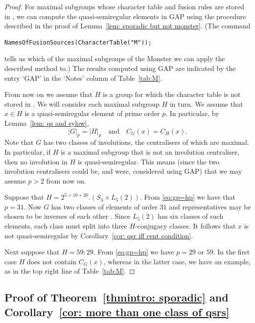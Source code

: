 \documentclass{article}
\theoremstyle{remark}
\theoremstyle{definition}
\newcommand{\qsr}{quasi-semiregular}
\newcommand{\qsre}{quasi-semiregular element}
\newcommand{\qsres}{quasi-semiregular elements}
\begin{document}
\begin{proof}
    For maximal subgroups    whose character table and fusion rules are stored in \cite{CTblLib}, we can compute the {\qsres} in GAP \cite{GAP4} using the procedure described in the proof of  Lemma~\ref{lem: sporadic but not monster}.  (The command \begin{verbatim}NamesOfFusionSources(CharacterTable("M"));\end{verbatim} tells us which of the maximal subgroups of the Monster we can apply  the described method to.)
    The results computed using GAP are indicated by the entry `GAP' in the `Notes' column of Table~\ref{tab:M}. 

    From now on we assume that $H$ is a group for which the character table is not stored in \cite{CTblLib}. We will consider each maximal subgroup $H$ in turn. We assume that $x\in H$ is a {\qsre} of prime order $p$. In particular, by Lemma~\ref{lem: qs and sylow}, 
    \begin{equation}
        \label{eq:gp=hp} |G|_p=|H|_p \quad \mbox{and}\quad C_G(x)=C_H(x).
    \end{equation} 
    Note that $G$ has two classes of involutions, the centralisers of which are maximal. In particular, if $H$ is a maximal subgroup that is not an involution centraliser, then no involution in $H$ is {\qsr}. This means (since the two involution centralisers could be, and were, considered using GAP) that we may assume $p>2$ from now on.






    Suppose that $H=2^{5+10+20}.(S_3 \times L_5(2))$. From \eqref{eq:gp=hp} we have that $p=31$. Now $G$ has two classes of elements of order $31$ and representatives may be chosen to be inverses of each other \cite{ATLAS}. Since $L_5(2)$ has six classes of such elements, each class must split into three $H$-conjugacy classes. It follows that $x$ is not {\qsr} by Corollary~\ref{cor: qsr iff cent condition}.

   
   
    Next suppose that $H=59:29$. From \eqref{eq:gp=hp} we have $p=29$ or $59$. In the first case  $H$ does not contain $C_G(x)$, whereas in the latter case, we have an example, as in the top right line of Table~\ref{tab:M}. 
    \end{proof}

\subsection{Proof of Theorem~\ref{thmintro: sporadic} and Corollary~\ref{cor: more than one class of qsrs}}
\end{document}
